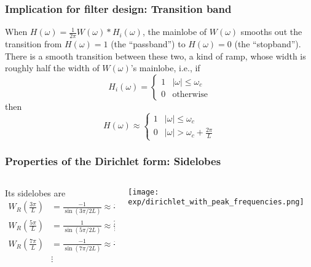 \documentclass{beamer}
\begin{document}
\begin{frame}
  \frametitle{Implication for filter design: Transition band}

  When $H(\omega)=\frac{1}{2\pi}W(\omega)\ast H_i(\omega)$, the
  mainlobe of $W(\omega)$ smooths out the transition from
  $H(\omega)=1$ (the ``passband'') to $H(\omega)=0$ (the
  ``stopband'').  There is a smooth transition between these two, a
  kind of ramp, whose width is roughly half the width of $W(\omega)$'s
  mainlobe, i.e., if
  \begin{displaymath}
    H_i(\omega) = \begin{cases}1&|\omega|\le\omega_c\\0&\text{otherwise}\end{cases}
  \end{displaymath}
  then
  \begin{displaymath}
    H(\omega) \approx \begin{cases}1&|\omega|\le\omega_c\\0& |\omega|>\omega_c+\frac{2\pi}{L}\end{cases}
  \end{displaymath}
\end{frame}

\begin{frame}
  \frametitle{Properties of the Dirichlet form: Sidelobes}

  \begin{columns}
    \begin{column}{0.5\textwidth}

      Its sidelobes are
      \begin{align*}      
        W_R\left(\frac{3\pi}{L}\right) &= \frac{-1}{\sin(3\pi/2L)}\approx \frac{-2L}{3\pi}\\
        W_R\left(\frac{5\pi}{L}\right) &= \frac{1}{\sin(5\pi/2L)}\approx \frac{2L}{5\pi}\\
        W_R\left(\frac{7\pi}{L}\right) &= \frac{-1}{\sin(7\pi/2L)}\approx \frac{-2L}{7\pi}\\
        & \vdots
      \end{align*}
    \end{column}
    \begin{column}{0.5\textwidth}
      \centerline{\texttt{[image: exp/dirichlet\_with\_peak\_frequencies.png]}}
    \end{column}
  \end{columns}
\end{frame}
\end{document}
